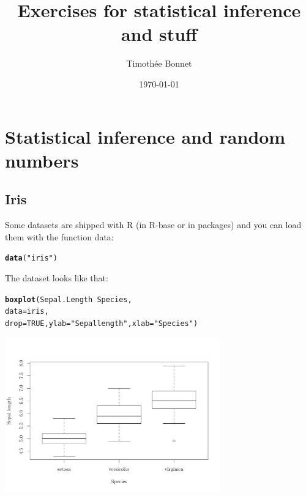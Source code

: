 \documentclass[12pt,a4paper]{scrartcl}\usepackage[]{graphicx}\usepackage[]{color}
\title{Exercises for statistical inference and stuff}
\date{\today}
\author{Timoth\'ee Bonnet}
\makeatletter
\newcommand{\hlnum}[1]{\textcolor[rgb]{0.686,0.059,0.569}{#1}}%
\newcommand{\hlstr}[1]{\textcolor[rgb]{0.192,0.494,0.8}{#1}}%
\newcommand{\hlopt}[1]{\textcolor[rgb]{0,0,0}{#1}}%
\newcommand{\hlstd}[1]{\textcolor[rgb]{0.345,0.345,0.345}{#1}}%
\newcommand{\hlkwc}[1]{\textcolor[rgb]{0.333,0.667,0.333}{#1}}%
\newcommand{\hlkwd}[1]{\textcolor[rgb]{0.737,0.353,0.396}{\textbf{#1}}}%
\newenvironment{kframe}{%
 \def\at@end@of@kframe{}%
 \ifinner\ifhmode%
  \def\at@end@of@kframe{\end{minipage}}%
  \begin{minipage}{\columnwidth}%
 \fi\fi%
 \def\FrameCommand##1{\hskip\@totalleftmargin \hskip-\fboxsep
 \colorbox{shadecolor}{##1}\hskip-\fboxsep
     \hskip-\linewidth \hskip-\@totalleftmargin \hskip\columnwidth}%
 \MakeFramed {\advance\hsize-\width
   \@totalleftmargin\z@ \linewidth\hsize
   \@setminipage}}%
 {\par\unskip\endMakeFramed%
 \at@end@of@kframe}
\newenvironment{knitrout}{}{} %
\makeatother
\begin{document}
\maketitle

\tableofcontents
\ListOfExerciseInToc
{}


\section{Statistical inference and random numbers}

\subsection{Iris}
Some datasets are shipped with R (in R-base or in packages) and you can load them with the function data:

\begin{knitrout}
\color{fgcolor}\begin{kframe}
\begin{alltt}
  \hlkwd{data}\hlstd{(}\hlstr{"iris"}\hlstd{)}
\end{alltt}
\end{kframe}
\end{knitrout}
  
  The dataset looks like that:
  
\begin{knitrout}
\color{fgcolor}\begin{kframe}
\begin{alltt}
  \hlkwd{boxplot}\hlstd{(Sepal.Length} \hlopt{~} \hlstd{Species,}
      \hlkwc{data} \hlstd{= iris,}
      \hlkwc{drop} \hlstd{=} \hlnum{TRUE}\hlstd{,} \hlkwc{ylab}\hlstd{=}\hlstr{"Sepal length"}\hlstd{,} \hlkwc{xlab}\hlstd{=}\hlstr{"Species"}\hlstd{)}
\end{alltt}
\end{kframe}
\includegraphics[width=0.7\textwidth,height=0.5\textwidth]{figure/boxplot-1} 

\end{knitrout}
\end{document}
